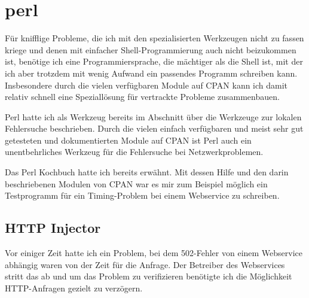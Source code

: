\section{perl}
\label{sec:lokal-werkzeuge-perl}
\begin{abstractsec}
  Für knifflige Probleme, die ich mit den spezialisierten Werkzeugen nicht zu
  fassen kriege und denen mit einfacher Shell-Programmierung auch nicht
  beizukommen ist, benötige ich eine Programmiersprache, die mächtiger als die
  Shell ist, mit der ich aber trotzdem mit wenig Aufwand ein passendes
  Programm schreiben kann. Insbesondere durch die vielen verfügbaren Module
  auf CPAN kann ich damit relativ schnell eine Speziallösung für vertrackte
  Probleme zusammenbauen.
\end{abstractsec}
\begin{normaltext}
  Perl hatte ich als Werkzeug bereits im Abschnitt über die Werkzeuge zur
  lokalen Fehlersuche beschrieben. Durch die vielen einfach verfügbaren und
  meist sehr gut getesteten und dokumentierten Module auf CPAN ist Perl auch
  ein unentbehrliches Werkzeug für die Fehlersuche bei Netzwerkproblemen.

  Das Perl Kochbuch \cite{ChristiansenTorkington04de} hatte ich bereits
  erwähnt. Mit dessen Hilfe und den darin beschriebenen Modulen von CPAN war
  es mir zum Beispiel möglich ein Testprogramm für ein Timing-Problem bei
  einem Webservice zu schreiben.

  \subsection*{HTTP Injector}

  Vor einiger Zeit hatte ich ein Problem, bei dem 502-Fehler von
  einem Webservice abhängig waren von der Zeit für die
  Anfrage. Der Betreiber des Webservices stritt das ab und um das
  Problem zu verifizieren benötigte ich die Möglichkeit HTTP-Anfragen gezielt
  zu verzögern.
  

\end{normaltext}
